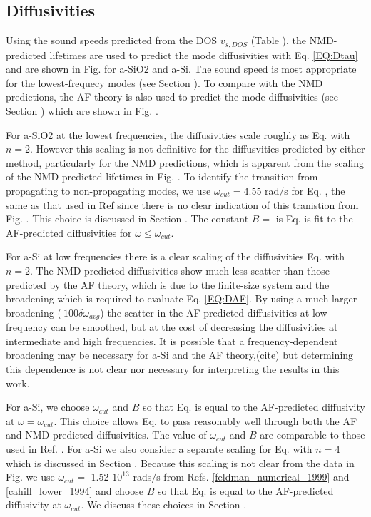 \documentclass[aps,prb,onecolumn,preprint,superscriptaddress,footinbib,amsmath,amssymb,floatfix]{revtex4}
\begin{document}
\subsection{\label{S:Diffusivities}Diffusivities}

Using the sound speeds predicted 
from the DOS $v_{s,DOS}$ (Table ), the NMD-predicted lifetimes are 
used to predict the mode diffusivities with Eq. \eqref{EQ:Dtau} 
and are shown in Fig. for a-SiO2 and a-Si. 
The sound speed is most appropriate  
for the lowest-frequecy modes (see Section ). To compare with the 
NMD predictions, the AF theory is also used to predict the mode 
diffusivities (see Section ) which are shown in Fig. . 

For a-SiO2 at the lowest frequencies, the 
diffusivities scale roughly as Eq. with $n=2$.  However this 
scaling is not definitive for the diffusvities predicted by either 
method, particularly for the NMD predictions, which 
is apparent from the scaling of the NMD-predicted lifetimes 
in Fig. . To identify the transition from propagating 
to non-propagating modes, we use $\omega_{cut} = 4.55$ rad$/$s 
for Eq. , 
the same as that used in Ref  since 
there is no clear indication of this tranistion from Fig. . 
This choice is discussed in Section . The constant 
$B=$ is Eq. 
is fit to the AF-predicted diffusivities for 
$\omega \le \omega_{cut}$.

For a-Si at low frequencies there is a clear scaling of the 
diffusivities Eq. with $n=2$.  
The NMD-predicted diffusivities show much less 
scatter than those predicted by the AF theory, which is due to 
the finite-size system and the broadening which is required to evaluate 
Eq. \eqref{EQ:DAF}.\cite{feldman_thermal_1993} By using a much larger 
broadening ($~100\delta\omega_{avg}$) the scatter in the AF-predicted 
diffusivities at low frequency can be smoothed, but at the cost of 
decreasing the diffusivities at intermediate and high frequencies. 
It is possible that a frequency-dependent broadening may be necessary 
for a-Si and the AF theory,(cite)  
but determining this dependence is not clear nor necessary for 
interpreting the results in this work.  

For a-Si, we choose $\omega_{cut}$ and $B$ so that Eq. is equal 
to the AF-predicted diffusivity at $\omega=\omega_{cut}$. This choice 
allows Eq. to pass reasonably well through both the AF and NMD-predicted 
diffusivities.  The value of $\omega_{cut}$ and $B$ are comparable to 
those used in Ref. .  For a-Si we also consider a separate scaling 
for Eq. with $n=4$ which is discussed in Section . Because this 
scaling is not clear from the data in Fig. we use 
$\omega_{cut} = $ 1.52 $10^13$ rads$/$s  
from Refs. \ref{feldman_numerical_1999} and \ref{cahill_lower_1994} 
and choose $B$ so that Eq. is equal to the AF-predicted 
diffusivity at $\omega_{cut}$. We discuss these choices in Section . 
\end{document}

